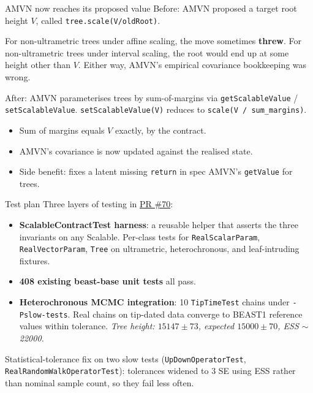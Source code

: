 \documentclass[aspectratio=169,11pt]{beamer}
\newcommand{\code}[1]{\texttt{#1}}
\begin{document}
\begin{frame}{AMVN now reaches its proposed value}
Before: AMVN proposed a target root height $V$, called \code{tree.scale(V/oldRoot)}.

\vspace{0.5em}

For non-ultrametric trees under affine scaling, the move sometimes \textbf{threw}.
For non-ultrametric trees under interval scaling, the root would end up at some height other than $V$.
Either way, AMVN's empirical covariance bookkeeping was wrong.

\vspace{1em}

After: AMVN parameterises trees by sum-of-margins via \code{getScalableValue} / \code{setScalableValue}.
\code{setScalableValue(V)} reduces to \code{scale(V / sum\_margins)}.

\begin{itemize}
\item Sum of margins equals $V$ exactly, by the contract.
\item AMVN's covariance is now updated against the realised state.
\item Side benefit: fixes a latent missing \texttt{return} in spec AMVN's \code{getValue} for trees.
\end{itemize}
\end{frame}

\begin{frame}{Test plan}
Three layers of testing in \href{https://github.com/CompEvol/beast3/pull/70}{PR \#70}:

\begin{itemize}
\item \textbf{ScalableContractTest harness}: a reusable helper that asserts the three invariants on any Scalable. Per-class tests for \code{RealScalarParam}, \code{RealVectorParam}, \code{Tree} on ultrametric, heterochronous, and leaf-intruding fixtures.

\item \textbf{408 existing beast-base unit tests} all pass.

\item \textbf{Heterochronous MCMC integration}: 10 \code{TipTimeTest} chains under \texttt{-Pslow-tests}.
Real chains on tip-dated data converge to BEAST1 reference values within tolerance.
\textit{Tree height: $15147 \pm 73$, expected $15000 \pm 70$, ESS $\sim$22000.}
\end{itemize}

\vspace{1em}

Statistical-tolerance fix on two slow tests (\code{UpDownOperatorTest}, \code{RealRandomWalkOperatorTest}): tolerances widened to 3 SE using ESS rather than nominal sample count, so they fail less often.
\end{frame}
\end{document}

